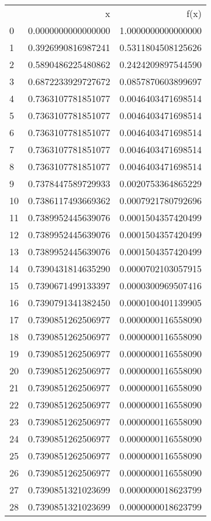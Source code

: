 \begin{tabular}{lrr}
 & x & f(x) \\
0 & 0.0000000000000000 & 1.0000000000000000  \\
1 & 0.3926990816987241 & 0.5311804508125626  \\
2 & 0.5890486225480862 & 0.2424209897544590  \\
3 & 0.6872233929727672 & 0.0857870603899697  \\
4 & 0.7363107781851077 & 0.0046403471698514  \\
5 & 0.7363107781851077 & 0.0046403471698514  \\
6 & 0.7363107781851077 & 0.0046403471698514  \\
7 & 0.7363107781851077 & 0.0046403471698514  \\
8 & 0.7363107781851077 & 0.0046403471698514  \\
9 & 0.7378447589729933 & 0.0020753364865229  \\
10 & 0.7386117493669362 & 0.0007921780792696  \\
11 & 0.7389952445639076 & 0.0001504357420499  \\
12 & 0.7389952445639076 & 0.0001504357420499  \\
13 & 0.7389952445639076 & 0.0001504357420499  \\
14 & 0.7390431814635290 & 0.0000702103057915  \\
15 & 0.7390671499133397 & 0.0000300969507416  \\
16 & 0.7390791341382450 & 0.0000100401139905  \\
17 & 0.7390851262506977 & 0.0000000116558090  \\
18 & 0.7390851262506977 & 0.0000000116558090  \\
19 & 0.7390851262506977 & 0.0000000116558090  \\
20 & 0.7390851262506977 & 0.0000000116558090  \\
21 & 0.7390851262506977 & 0.0000000116558090  \\
22 & 0.7390851262506977 & 0.0000000116558090  \\
23 & 0.7390851262506977 & 0.0000000116558090  \\
24 & 0.7390851262506977 & 0.0000000116558090  \\
25 & 0.7390851262506977 & 0.0000000116558090  \\
26 & 0.7390851262506977 & 0.0000000116558090  \\
27 & 0.7390851321023699 & 0.0000000018623799  \\
28 & 0.7390851321023699 & 0.0000000018623799  \\

\end{tabular}
